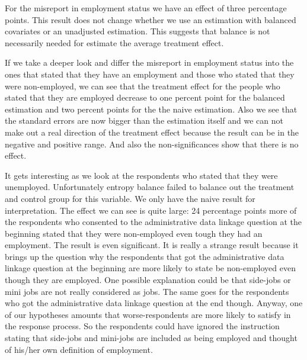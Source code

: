 For the misreport in employment status we have an effect of three percentage points. This result does not change whether we use an estimation with balanced covariates or an unadjusted estimation. This suggests that balance is not necessarily needed for estimate the average treatment effect. 

If we take a deeper look and differ the misreport in employment status into the ones that stated that they have an employment and those who stated that they were non-employed, we can see that the treatment effect for the people who stated that they are employed decrease to one percent point for the balanced estimation and two percent points for the the naive estimation. Also we see that the standard errors are now bigger than the estimation itself and we can not make out a real direction of the treatment effect because the result can be in the negative and positive range. And also the non-significances show that there is no effect. 

It gets interesting as we look at the respondents who stated that they were unemployed. Unfortunately entropy balance failed to balance out the treatment and control group for this variable. We only have the naive result for interpretation. The effect we can see is quite large: 24 percentage points more of the respondents who consented to the administrative data linkage question at the beginning stated that they were non-employed even tough they had an employment. The result is even significant. It is really a strange result because it brings up the question why the respondents that got the administrative data linkage question at the beginning are more likely to state be non-employed even though they are employed. One possible explanation could be that side-jobs or mini jobs are not really considered as jobs. The same goes for the respondents who got the administrative data linkage question at the end though. Anyway, one of our hypotheses amounts that worse-respondents are more likely to satisfy in the response process. So the respondents could have ignored the instruction stating that side-jobs and mini-jobs are included as being employed and thought of his/her own definition of employment. 

